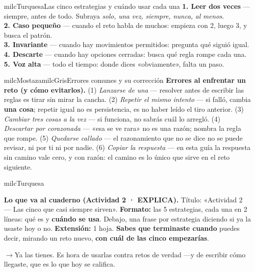 \documentclass[11pt,letterpaper]{article}
\newcommand{\puente}[1]{%
  \begin{puentebox}%
    \textcolor{milcGradeDark}{$\rightarrow$}\hspace{2mm}#1%
  \end{puentebox}%
}
\begin{document}
\begin{drawbox}{milcTurquesa}{Las cinco estrategias y cuándo usar cada una}
\textbf{1. Leer dos veces} --- siempre, antes de todo. Subraya \emph{solo, una vez, siempre, nunca, al menos}. \\[1mm]
\textbf{2. Caso pequeño} --- cuando el reto habla de muchos: empieza con 2, luego 3, y busca el patrón. \\[1mm]
\textbf{3. Invariante} --- cuando hay movimientos permitidos: pregunta qué siguió igual. \\[1mm]
\textbf{4. Descarte} --- cuando hay opciones cerradas: busca qué regla rompe cada una. \\[1mm]
\textbf{5. Voz alta} --- todo el tiempo: donde dices «obviamente», falta un paso.
\end{drawbox}

\begin{softbox}{milcMostaza}{milcGris}{Errores comunes y su corrección}
\textbf{Errores al enfrentar un reto (y cómo evitarlos).} (1) \emph{Lanzarse de una} --- resolver antes de escribir las reglas es tirar sin mirar la cancha. (2) \emph{Repetir el mismo intento} --- si falló, cambia \textbf{una cosa}; repetir igual no es persistencia, es no haber leído el tiro anterior. (3) \emph{Cambiar tres cosas a la vez} --- si funciona, no sabrás cuál lo arregló. (4) \emph{Descartar por corazonada} --- «esa se ve rara» no es una razón; nombra la regla que rompe. (5) \emph{Quedarse callado} --- el razonamiento que no se dice no se puede revisar, ni por ti ni por nadie. (6) \emph{Copiar la respuesta} --- en esta guía la respuesta sin camino vale cero, y con razón: el camino es lo único que sirve en el reto siguiente.
\end{softbox}

\begin{infoband}{milcTurquesa}


\textbf{Lo que va al cuaderno (Actividad 2 · EXPLICA).} Título: «Actividad 2 --- Las cinco que casi siempre sirven». \textbf{Formato:} las 5 estrategias, cada una en 2 líneas: qué es y \textbf{cuándo se usa}. Debajo, una frase por estrategia diciendo si ya la usaste hoy o no. \textbf{Extensión:} 1 hoja. \textbf{Sabes que terminaste cuando} puedes decir, mirando un reto nuevo, \textbf{con cuál de las cinco empezarías}.
\end{infoband}

\puente{Ya las tienes. Es hora de usarlas contra retos de verdad ---y de escribir cómo llegaste, que es lo que hoy se califica.}
\end{document}

